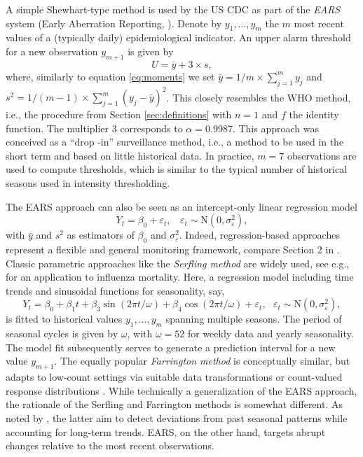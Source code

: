 \documentclass[12pt]{article}
\begin{document}
A simple Shewhart-type method is used by the US CDC as part of the \textit{EARS} system (Early Aberration Reporting, \citealt{Hutwagner2003}). Denote by $y_1, \dots, y_m$ the $m$ most recent values of a (typically daily) epidemiological indicator. An upper alarm threshold for a new observation $y_{m + 1}$ is given by
$$
U = \bar{y} + 3 \times s,
$$ 
where, similarly to equation \eqref{eq:moments} we set $\bar{y} = 1/m \times \sum_{j = 1}^m y_j$ and $s^2 = 1/(m - 1) \times \sum_{j = 1}^m (y_j - \bar{y})^2$. This closely resembles the WHO method, i.e., the procedure from Section \ref{sec:definitions} with $n = 1$ and $f$ the identity function. The multiplier 3 corresponds to $\alpha = 0.9987$. This approach was conceived as a ``drop -in'' surveillance method, i.e., a method to be used in the short term and based on little historical data. In practice, $m = 7$ observations are used to compute thresholds, which is similar to the typical number of historical seasons used in intensity thresholding.

The EARS approach can also be seen as an intercept-only linear regression model
$$
Y_{t} = \beta_0 + \varepsilon_{t}, \ \ \ \ \varepsilon_t \sim \text{N}(0, \sigma_\varepsilon^2),
$$
with $\bar{y}$ and $s^2$ as estimators of $\beta_0$ and $\sigma_\varepsilon^2$. Indeed, regression-based approaches represent a flexible and general monitoring framework, compare Section 2 in \cite{Unkel2012}. Classic parametric approaches like the \textit{Serfling method} \citep{Serfling1896} are widely used, see e.g., \cite{Thompson2009} for an application to influenza mortality. Here, a regression model including time trends and sinusoidal functions for seasonality, say,
\begin{equation}
Y_{t} = \beta_0 + \beta_1 t + \beta_3 \sin(2\pi t / \omega) + \beta_4 \cos(2\pi t / \omega) + \varepsilon_t, \ \ \ \varepsilon_t \sim \text{N}(0, \sigma_\varepsilon^2),
\label{eq:serfling}
\end{equation}
is fitted to historical values $y_1, \dots, y_m$ spanning multiple seasons. The period of seasonal cycles is given by $\omega$, with $\omega = 52$ for weekly data and yearly seasonality. The model fit subsequently serves to generate a prediction interval for a new value $y_{m + 1}$. The equally popular \textit{Farrington method} is conceptually similar, but adapts to low-count settings via suitable data transformations \citep{Farrington1996} or count-valued response distributions \citep{Noufaily2013}. While technically a generalization of the EARS approach, the rationale of the Serfling and Farrington methods is somewhat different. As noted by \cite{Hutwagner2003}, the latter aim to detect deviations from past seasonal patterns while accounting for long-term trends. EARS, on the other hand, targets abrupt changes relative to the most recent observations.
\end{document}
